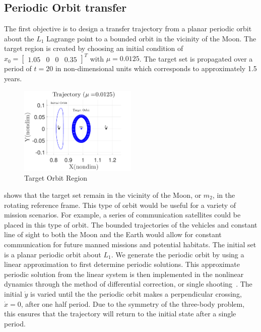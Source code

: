 \documentclass[preprint]{elsarticle}
\begin{document}
\subsection{Periodic Orbit transfer}\label{sec:periodic_orbit_transfer}
The first objective is to design a transfer trajectory from a planar periodic orbit about the \( L_1\) Lagrange point to a bounded orbit in the vicinity of the Moon.
The target region is created by choosing an initial condition of \( x_0 = \begin{bmatrix}1.05 & 0 & 0 & 0.35 \end{bmatrix}^T \) with \( \mu = 0.0125 \).
The target set is propagated over a period of \( t = \num{20} \) in non-dimensional units which corresponds to approximately \num{1.5} years.
\begin{figure}[htbp]
   \centering
   \includegraphics[width=0.5\textwidth]{moon_orbit} %
   \caption{Target Orbit Region}
   \label{fig:moon_orbit}
\end{figure}
 shows that the target set remain in the vicinity of the Moon, or \( m_2\), in the rotating reference frame. 
This type of orbit would be useful for a variety of mission scenarios.
For example, a series of communication satellites could be placed in this type of orbit. 
The bounded trajectories of the vehicles and constant line of sight to both the Moon and the Earth would allow for constant communication for future manned missions and potential habitats.
The initial set is a planar periodic orbit about \( L_1\).
We generate the periodic orbit by using a linear approximation to first determine periodic solutions.
This approximate periodic solution from the linear system is then implemented in the nonlinear dynamics through the method of differential correction, or single shooting~\cite{koon2011}.
The initial \( \dot{y} \) is varied until the the periodic orbit makes a perpendicular crossing, \( \dot{x} = 0 \), after one half period.
Due to the symmetry of the three-body problem, this ensures that the trajectory will return to the initial state after a single period. 
\end{document}
